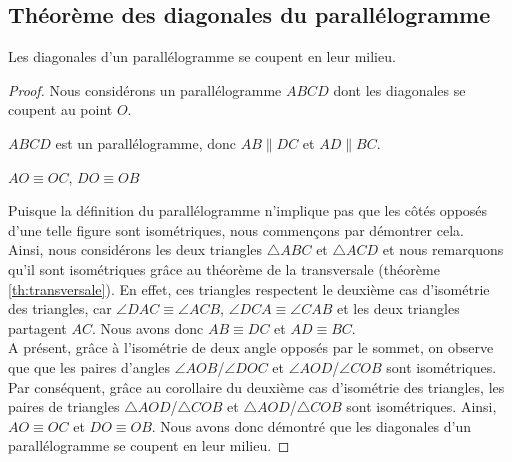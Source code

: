\documentclass[a4paper,12pt]{article}
\begin{document}
\pagebreak
\subsection{Théorème des diagonales du parallélogramme}
\begin{theorem}\label{th:parallelogramme}
Les diagonales d'un parallélogramme se coupent en leur milieu.
\end{theorem}

\begin{proof}
Nous considérons un parallélogramme $ABCD$ dont les diagonales se coupent au point $O$.
\begin{hyp}
$ABCD$ est un parallélogramme, donc $AB \parallel DC$ et $AD \parallel BC$.
\end{hyp}

\begin{concl}
$AO \equiv OC$, $DO \equiv OB$
\end{concl}
Puisque la définition du parallélogramme n'implique pas que les côtés opposés d'une telle figure sont isométriques, nous commençons par démontrer cela. \\
Ainsi, nous considérons les deux triangles $\triangle ABC$ et $\triangle ACD$ et nous remarquons qu'il sont isométriques grâce au théorème de la transversale (théorème \ref{th:transversale}). En effet, ces triangles respectent le deuxième cas d'isométrie des triangles, car $\angle DAC \equiv \angle ACB$, $\angle DCA \equiv \angle CAB$ et les deux triangles partagent $AC$. Nous avons donc $AB \equiv DC$ et $AD \equiv BC$.\\

A présent, grâce à l'isométrie de deux angle opposés par le sommet, on observe que que les paires d'angles $\angle AOB$/$\angle DOC$ et $\angle AOD$/$\angle COB$ sont isométriques. Par conséquent, grâce au corollaire du deuxième cas d'isométrie des triangles, les paires de triangles $\triangle AOD$/$\triangle COB$ et $\triangle AOD$/$\triangle COB$ sont isométriques. Ainsi, $AO \equiv OC$ et $DO \equiv OB$. Nous avons donc démontré que les diagonales d'un parallélogramme se coupent en leur milieu.
\end{proof}
\end{document}
